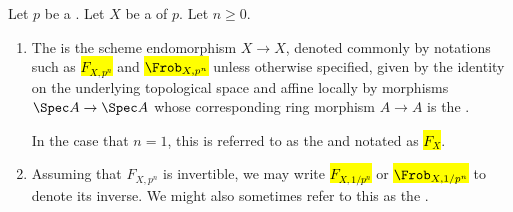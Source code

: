\begin{definition} \label{definition:absolute_p_nth_power_frobenius_morphism_on_a_scheme}
    Let $p$ be a . Let $X$ be a  of  $p$. Let $n \geq 0$. 
    \begin{enumerate}
        \item The  is the scheme endomorphism $X \to X$, denoted commonly by notations such as \hl{$F_{X,p^n}$} and \hl{$\Frob_{X,p^n}$} unless otherwise specified, given by the identity on the underlying topological space and affine locally by morphisms $\Spec A \to \Spec A$ whose corresponding ring morphism $A \to A$ is the . 

        In the case that $n = 1$, this is referred to as the  and notated as \hl{$F_{X}$}.

        \item Assuming that $F_{X,p^n}$ is invertible, we may write \hl{$F_{X, 1/p^n}$} or \hl{$\Frob_{X,1/p^n}$} to denote its inverse. We might also sometimes refer to this as the .
    \end{enumerate}    
\end{definition}